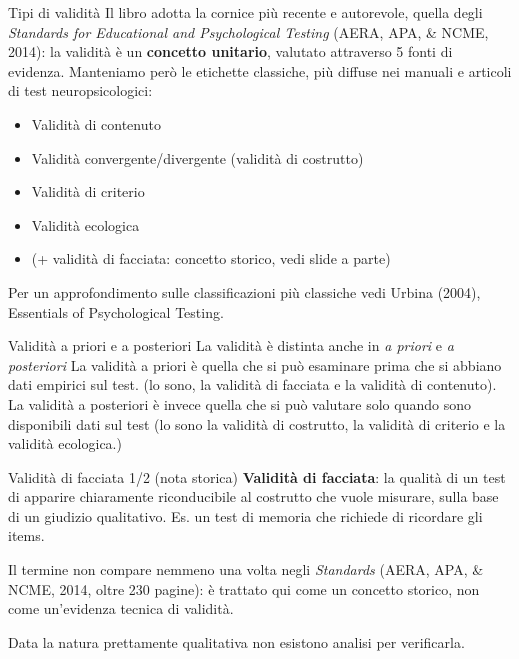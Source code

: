 \documentclass[
  ignorenonframetext,
]{beamer}
\providecommand{\tightlist}{%
  \setlength{\itemsep}{0pt}\setlength{\parskip}{0pt}}
\begin{document}
\begin{frame}{Tipi di validità}
\label{tipi-di-validituxe0}
Il libro adotta la cornice più recente e autorevole, quella degli
\emph{Standards for Educational and Psychological Testing} (AERA, APA,
\& NCME, 2014): la validità è un \textbf{concetto unitario}, valutato
attraverso 5 fonti di evidenza. Manteniamo però le etichette classiche,
più diffuse nei manuali e articoli di test neuropsicologici:

\begin{itemize}
\tightlist
\item
  Validità di contenuto
\item
  Validità convergente/divergente (validità di costrutto)
\item
  Validità di criterio
\item
  Validità ecologica
\item
  (+ validità di facciata: concetto storico, vedi slide a parte)
\end{itemize}

Per un approfondimento sulle classificazioni più classiche vedi Urbina
(2004), Essentials of Psychological Testing.
\end{frame}

\begin{frame}{Validità a priori e a posteriori}
\label{validituxe0-a-priori-e-a-posteriori}
La validità è distinta anche in \emph{a priori} e \emph{a posteriori} La
validità a priori è quella che si può esaminare prima che si abbiano
dati empirici sul test. (lo sono, la validità di facciata e la validità
di contenuto). La validità a posteriori è invece quella che si può
valutare solo quando sono disponibili dati sul test (lo sono la validità
di costrutto, la validità di criterio e la validità ecologica.)
\end{frame}

\begin{frame}{Validità di facciata 1/2 (nota storica)}
\label{validituxe0-di-facciata-12-nota-storica}
\textbf{Validità di facciata}: la qualità di un test di apparire
chiaramente riconducibile al costrutto che vuole misurare, sulla base di
un giudizio qualitativo. Es. un test di memoria che richiede di
ricordare gli items.

Il termine non compare nemmeno una volta negli \emph{Standards} (AERA,
APA, \& NCME, 2014, oltre 230 pagine): è trattato qui come un concetto
storico, non come un'evidenza tecnica di validità.

Data la natura prettamente qualitativa non esistono analisi per
verificarla.
\end{frame}
\end{document}
